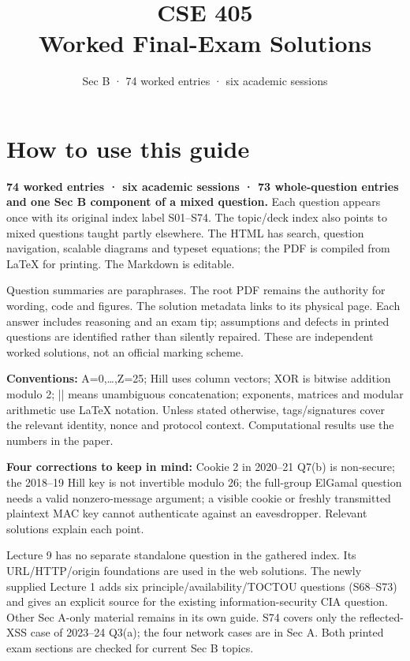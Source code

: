 \documentclass[11pt,a4paper]{article}
\title{\sffamily\bfseries CSE 405\\[4pt]Worked Final-Exam Solutions}
\author{Sec B · 74 worked entries · six academic sessions}
\date{}
\begin{document}
\maketitle
\tableofcontents
\clearpage


\clearpage
\section{How to use this guide}

\textbf{74 worked entries · six academic sessions · 73 whole-question entries and one Sec B component of a mixed question.} Each question appears once with its original index label S01–S74. The topic/\allowbreak{}deck index also points to mixed questions taught partly elsewhere. The HTML has search,\allowbreak{} question navigation,\allowbreak{} scalable diagrams and typeset equations; the PDF is compiled from LaTeX for printing. The Markdown is editable.


Question summaries are paraphrases. The root PDF remains the authority for wording,\allowbreak{} code and figures. The solution metadata links to its physical page. Each answer includes reasoning and an exam tip; assumptions and defects in printed questions are identified rather than silently repaired. These are independent worked solutions,\allowbreak{} not an official marking scheme.


\textbf{Conventions:} A=\allowbreak{}0,\allowbreak{}…,\allowbreak{}Z=\allowbreak{}25; Hill uses column vectors; XOR is bitwise addition modulo 2; || means unambiguous concatenation; exponents,\allowbreak{} matrices and modular arithmetic use LaTeX notation. Unless stated otherwise,\allowbreak{} tags/\allowbreak{}signatures cover the relevant identity,\allowbreak{} nonce and protocol context. Computational results use the numbers in the paper.


\textbf{Four corrections to keep in mind:} Cookie 2 in 2020–21 Q7(b) is non-secure; the 2018–19 Hill key is not invertible modulo 26; the full-group ElGamal question needs a valid nonzero-message argument; a visible cookie or freshly transmitted plaintext MAC key cannot authenticate against an eavesdropper. Relevant solutions explain each point.


Lecture 9 has no separate standalone question in the gathered index. Its URL/\allowbreak{}HTTP/\allowbreak{}origin foundations are used in the web solutions. The newly supplied Lecture 1 adds six principle/\allowbreak{}availability/\allowbreak{}TOCTOU questions (S68–S73) and gives an explicit source for the existing information-security CIA question. Other Sec A-only material remains in its own guide. S74 covers only the reflected-XSS case of 2023–24 Q3(a); the four network cases are in Sec A. Both printed exam sections are checked for current Sec B topics.
\end{document}
